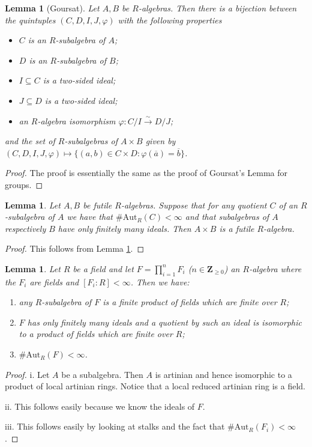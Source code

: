 \documentclass{amsart}
\theoremstyle{plain}
\newtheorem{lemma}[theorem]{Lemma}
\theoremstyle{definition}
\begin{document}
\begin{lemma}[Goursat] \label{5}
 Let $A, B$ be $R$-algebras. Then there is a bijection between the quintuples $(C,D,I,J,\varphi)$ with the following properties
\begin{itemize}
\item $C$ is an $R$-subalgebra of $A$;
\item $D$ is an $R$-subalgebra of $B$;
\item $I \subseteq C$ is a two-sided ideal;
\item $J \subseteq D$ is a two-sided ideal;
\item an $R$-algebra isomorphism $\varphi: C/I \overset{\sim}{\to} D/J$;
\end{itemize}
and the set of $R$-subalgebras of $A \times B$ given by $(C,D,I,J,\varphi) \mapsto \{(a,b) \in C \times D: \varphi(\overline{a})=\overline{b}\}$. 
\end{lemma}
\begin{proof}
 The proof is essentially the same as the proof of Goursat's Lemma for groups. 
\end{proof}
  

\begin{lemma} \label{11}
 Let $A,B$ be futile $R$-algebras. Suppose that for any quotient $C$ of an $R$-subalgebra of $A$
we have that $\#
\mathrm{Aut}_R(C)<\infty$ and that subalgebras of $A$ respectively $B$ have only finitely many ideals. Then $A \times B$ is a futile
$R$-algebra.
\end{lemma}
\begin{proof}
 This follows from Lemma \ref{5}.
\end{proof}

\begin{lemma} \label{12}
 Let $R$ be a field and let $F=\prod_{i=1}^n F_i$ ($n \in {\mathbf{Z}}_{\geq 0}$) an $R$-algebra where the $F_i$ are fields and $[F_i:R]<\infty$. Then we have:
\begin{enumerate}
 \item any $R$-subalgebra of $F$ is a finite product of fields which are finite over $R$;
 \item $F$ has only finitely many ideals and a quotient by such an ideal is isomorphic to a product
of fields which are finite over $R$;
 \item $\# \mathrm{Aut}_R(F)<\infty$.
\end{enumerate}
\end{lemma}
\begin{proof}
 i. Let $A$ be a subalgebra. Then $A$ is artinian and hence isomorphic to a product of local artinian rings. Notice that a local reduced artinian
ring is a field.

 ii. This follows easily because we know the ideals of $F$. 

 iii. This follows easily by looking at stalks and the fact that $\#\mathrm{Aut}_R(F_i)<\infty$.

\end{proof}
\end{document}
